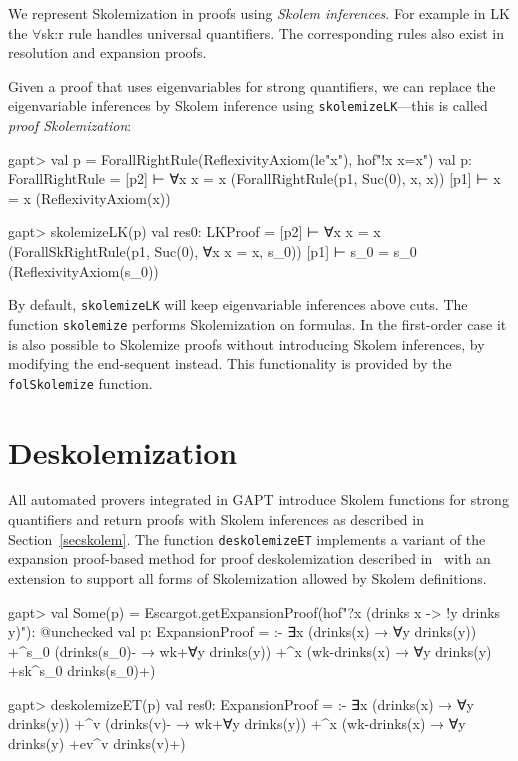 \documentclass[a4paper,11pt]{book}
\begin{document}
We represent Skolemization in proofs using \emph{Skolem inferences}.  For
example in LK the $\forall$sk:r rule handles universal quantifiers.  The
corresponding rules also exist in resolution and expansion proofs.
\begin{prooftree}
\end{prooftree}

Given a proof that uses eigenvariables for strong quantifiers, we can replace
the eigenvariable inferences by Skolem inference using
\texttt{skolemizeLK}---this is called \emph{proof Skolemization}:
\begin{clilisting}
gapt> val p = ForallRightRule(ReflexivityAxiom(le"x"), hof"!x x=x")
val p: ForallRightRule = [p2]  ⊢ ∀x x = x    (ForallRightRule(p1, Suc(0), x, x))
[p1]  ⊢ x = x    (ReflexivityAxiom(x))

gapt> skolemizeLK(p)
val res0: LKProof = [p2]  ⊢ ∀x x = x    (ForallSkRightRule(p1, Suc(0), ∀x x = x, s_0))
[p1]  ⊢ s_0 = s_0    (ReflexivityAxiom(s_0))

\end{clilisting}

By default, \texttt{skolemizeLK} will keep eigenvariable inferences above cuts.
The function \texttt{skolemize} performs Skolemization on formulas.
In the first-order case it is also possible to Skolemize proofs without
introducing Skolem inferences, by modifying the end-sequent instead.  This
functionality is provided by the \texttt{folSkolemize} function.

\section{Deskolemization}

All automated provers integrated in GAPT introduce Skolem functions for strong
quantifiers and return proofs with Skolem inferences as described in
Section~\ref{secskolem}.  The function \texttt{deskolemizeET} implements a
variant of the expansion proof-based method for proof deskolemization
described in~\cite{Baaz2012Complexity} with an extension to support all forms
of Skolemization allowed by Skolem definitions.
\begin{clilisting}
gapt> val Some(p) = Escargot.getExpansionProof(hof"?x (drinks x -> !y drinks y)"): @unchecked
val p: ExpansionProof = 
:-
∃x (drinks(x) → ∀y drinks(y))
  +^{s_0} (drinks(s_0)- → wk+{∀y drinks(y)})
  +^{x} (wk-{drinks(x)} → ∀y drinks(y) +sk^{s_0} drinks(s_0)+)

gapt> deskolemizeET(p)
val res0: ExpansionProof = 
:-
∃x (drinks(x) → ∀y drinks(y))
  +^{v} (drinks(v)- → wk+{∀y drinks(y)})
  +^{x} (wk-{drinks(x)} → ∀y drinks(y) +ev^{v} drinks(v)+)

\end{clilisting}
\end{document}
